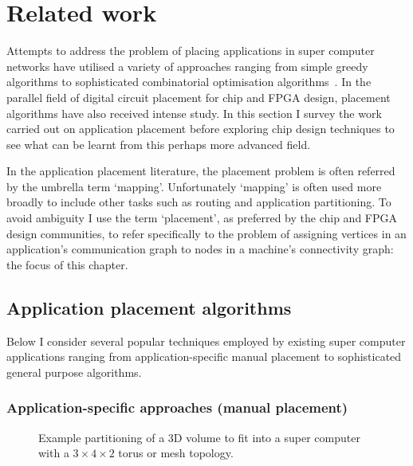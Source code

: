 	\section{Related work}
		
		Attempts to address the problem of placing applications in super computer
		networks have utilised a variety of approaches ranging from simple greedy
		algorithms to sophisticated combinatorial optimisation
		algorithms~\cite{jeannot14}. In the parallel field of digital circuit
		placement for chip and FPGA design, placement algorithms have also received
		intense study.  In this section I survey the work carried out on
		application placement before exploring chip design techniques to see what
		can be learnt from this perhaps more advanced field.
		
		In the application placement literature, the placement problem is often
		referred by the umbrella term `mapping'. Unfortunately `mapping' is often
		used more broadly to include other tasks such as routing and application
		partitioning. To avoid ambiguity I use the term `placement', as preferred
		by the chip and FPGA design communities, to refer specifically to the
		problem of assigning vertices in an application's communication graph to
		nodes in a machine's connectivity graph: the focus of this chapter.
		
		\subsection{Application placement algorithms}
			
			Below I consider several popular techniques employed by existing super
			computer applications ranging from application-specific manual placement
			to sophisticated general purpose algorithms.
			
			\subsubsection{Application-specific approaches (manual placement)}
				
				\begin{figure}
					\center
					
					\caption[Partitioning of a 3D volumn for a $3\times4\times2$ torus.]%
					{Example partitioning of a 3D volume to fit into a super
					computer with a $3\times4\times2$ torus or mesh topology.}
					\label{fig:fem-partitioning}
				\end{figure}
				
